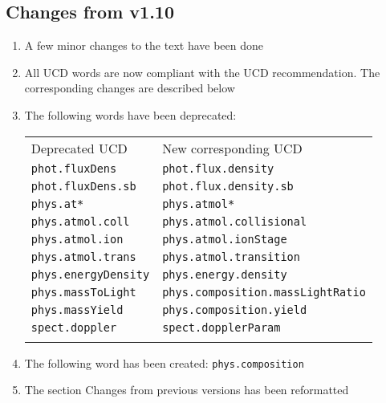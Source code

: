 \documentclass[11pt,a4paper]{ivoa}
\begin{document}
\subsection{Changes from v1.10}
\begin{enumerate}
\item A few minor changes to the text have been done
\item All UCD words are now compliant with the UCD recommendation. The corresponding changes are described below
\item The following words have been deprecated:

\begin{tabular}{|l|l|}
\sptablerule
Deprecated UCD & New corresponding UCD\\
\sptablerule
{\tt phot.fluxDens} & {\tt phot.flux.density}\\
{\tt phot.fluxDens.sb} & {\tt phot.flux.density.sb}\\ 
{\tt phys.at*} & {\tt phys.atmol*}\\
{\tt phys.atmol.coll} & {\tt phys.atmol.collisional}\\
{\tt phys.atmol.ion} & {\tt phys.atmol.ionStage}\\
{\tt phys.atmol.trans} & {\tt phys.atmol.transition}\\
{\tt phys.energyDensity} & {\tt phys.energy.density}\\
{\tt phys.massToLight} & {\tt phys.composition.massLightRatio}\\
{\tt phys.massYield} & {\tt phys.composition.yield}\\
{\tt spect.doppler} & {\tt spect.dopplerParam}\\
\sptablerule
\end{tabular}

\item The following word has been created: {\tt phys.composition}
\item The section Changes from previous versions has been reformatted
\end{enumerate}
\end{document}
